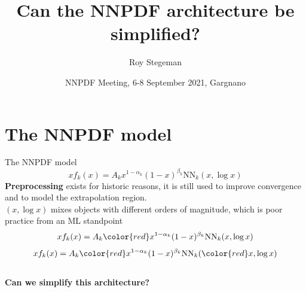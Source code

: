 \documentclass[aspectratio=169,11pt]{beamer}
\title{Can the NNPDF architecture be simplified?}
\date{NNPDF Meeting, 6-8 September 2021, Gargnano}
\author{Roy Stegeman}
\institute{University of Milan and INFN Milan}
\newcommand{\nn}{\vspace*{1em}}
\begin{document}
{
\begin{frame}
  \titlepage
\end{frame}
}


\section*{The NNPDF model}



\begin{frame}[t]{The NNPDF model}
   {$$ xf_k(x) = A_k x^{1-\alpha_k}(1-x)^{\beta_k} \mathrm{NN}_k(x,\log x) $$}
   {{\bf Preprocessing} exists for historic reasons, it is still used to improve convergence and to model the extrapolation region. \\ \nn}
   {$(x,\log x)$ mixes objects with different orders of magnitude, which is poor practice from an ML standpoint \\ \nn}
   {$$ xf_k(x) = A_k {\color{red} x^{1-\alpha_k}(1-x)^{\beta_k}} \mathrm{NN}_k(x,\log x) $$}
   {$$ xf_k(x) = A_k {\color{red} x^{1-\alpha_k}(1-x)^{\beta_k}} \mathrm{NN}_k({\color{red} x,\log x}) $$}
   {\\ \vspace*{1.5cm} \bf \centering Can we simplify this architecture?}
\end{frame}
\end{document}
